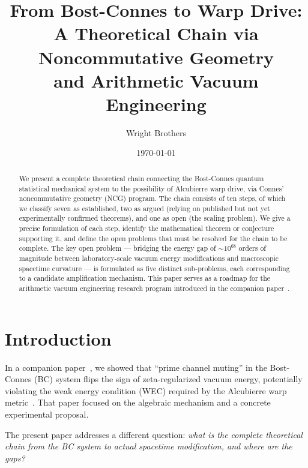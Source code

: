 \documentclass[aps,prd,twocolumn,superscriptaddress,nofootinbib]{revtex4-2}
\begin{document}
\title{From Bost-Connes to Warp Drive:\\
  A Theoretical Chain via Noncommutative Geometry\\
  and Arithmetic Vacuum Engineering}

\author{Wright Brothers}
\date{\today}

\begin{abstract}
We present a complete theoretical chain connecting the Bost-Connes
quantum statistical mechanical system to the possibility of
Alcubierre warp drive, via Connes' noncommutative geometry (NCG)
program. The chain consists of ten steps, of which we classify
seven as established, two as argued (relying on published but
not yet experimentally confirmed theorems), and one as open
(the scaling problem). We give a precise formulation of each step,
identify the mathematical theorem or conjecture supporting it,
and define the open problems that must be resolved for the chain
to be complete. The key open problem --- bridging the energy gap
of $\sim 10^{68}$ orders of magnitude between laboratory-scale
vacuum energy modifications and macroscopic spacetime curvature ---
is formulated as five distinct sub-problems, each corresponding to
a candidate amplification mechanism. This paper serves as a roadmap
for the arithmetic vacuum engineering research program introduced
in the companion paper~\cite{paper_A}.
\end{abstract}

\maketitle

\section{Introduction}
\label{sec:intro}

In a companion paper~\cite{paper_A}, we showed that ``prime channel
muting'' in the Bost-Connes (BC) system flips the sign of
zeta-regularized vacuum energy, potentially violating the weak
energy condition (WEC) required by the Alcubierre warp
metric~\cite{Alcubierre1994}. That paper focused on the algebraic
mechanism and a concrete experimental proposal.

The present paper addresses a different question: \emph{what is the
complete theoretical chain from the BC system to actual spacetime
modification, and where are the gaps?}
\end{document}
